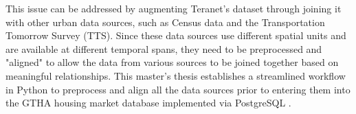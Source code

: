 This issue can be addressed by augmenting Teranet's dataset through joining it with other urban data sources, such as Census data and the Transportation Tomorrow Survey (TTS).
Since these data sources use different spatial units and are available at different temporal spans, they need to be preprocessed and "aligned" to allow the data from various sources to be joined together based on meaningful relationships.
This master's thesis establishes a streamlined workflow in Python to preprocess and align all the data sources prior to entering them into the GTHA housing market database implemented via PostgreSQL .
